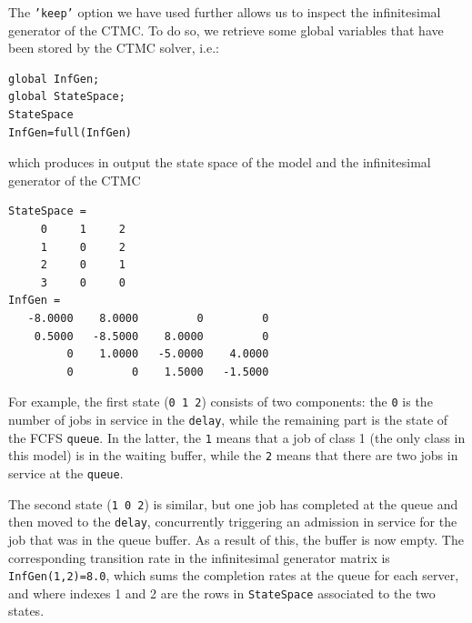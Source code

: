 The \texttt{'keep'} option we have used further allows us to inspect the infinitesimal generator of the CTMC. To do so, we retrieve some global variables that have been stored by the CTMC solver, i.e.:
\begin{lstlisting}
global InfGen;
global StateSpace;
StateSpace
InfGen=full(InfGen)
\end{lstlisting}
which produces in output the state space of the model and the infinitesimal generator of the CTMC
\begin{lstlisting}
StateSpace =
     0     1     2
     1     0     2
     2     0     1
     3     0     0
InfGen =
   -8.0000    8.0000         0         0
    0.5000   -8.5000    8.0000         0
         0    1.0000   -5.0000    4.0000
         0         0    1.5000   -1.5000
\end{lstlisting}
For example, the first state (\texttt{0 1 2}) consists of two components: the \texttt{0} is the number of jobs in service in the \texttt{delay}, while the remaining part is the state of the FCFS \texttt{queue}. In the latter, the \texttt{1} means that a job of class 1 (the only class in this model) is in the waiting buffer, while the \texttt{2} means that there are two jobs in service at the \texttt{queue}.

The second state (\texttt{1 0 2}) is similar, but one job has completed at the {queue} and then moved to the \texttt{delay}, concurrently triggering an admission in service for the job that was in the queue buffer. As a result of this, the buffer is now empty. The corresponding transition rate in the infinitesimal generator matrix is \texttt{InfGen(1,2)=8.0}, which sums the completion rates at the queue for each server, and where indexes 1 and 2 are the rows in \texttt{StateSpace} associated to the two states.

